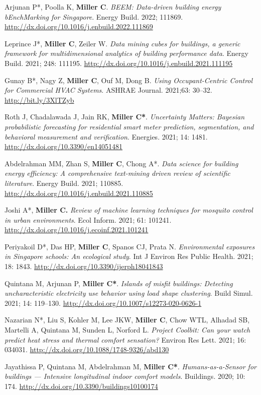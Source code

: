 \documentclass[10pt,a4paper]{article}
\begin{document}
\begin{small}
\begin{etaremune}
\item
Arjunan P*, Poolla K, \textbf{Miller C}. \emph{BEEM: Data-driven building energy bEnchMarking for Singapore}. Energy Build. 2022; 111869. \url{http://dx.doi.org/10.1016/j.enbuild.2022.111869}
\item
Leprince J*, \textbf{Miller C}, Zeiler W. \emph{Data mining cubes for buildings, a generic framework for multidimensional analytics of building performance data}. Energy Build. 2021; 248: 111195. \url{http://dx.doi.org/10.1016/j.enbuild.2021.111195}
\item
Gunay B*, Nagy Z, \textbf{Miller C}, Ouf M, Dong B. \emph{Using Occupant-Centric Control for Commercial HVAC Systems}. ASHRAE Journal. 2021;63: 30–32. \url{http://bit.ly/3XlTZyb}
\item
Roth J, Chadalawada J, Jain RK, \textbf{Miller C*}. \emph{Uncertainty Matters: Bayesian probabilistic forecasting for residential smart meter prediction, segmentation, and behavioral measurement and verification}. Energies. 2021; 14: 1481. \url{http://dx.doi.org/10.3390/en14051481}
\item
Abdelrahman MM, Zhan S, \textbf{Miller C}, Chong A*. \emph{Data science for building energy efficiency: A comprehensive text-mining driven review of scientific literature}. Energy Build. 2021; 110885. \url{http://dx.doi.org/10.1016/j.enbuild.2021.110885}
\item
Joshi A*, \textbf{Miller C.} \emph{Review of machine learning techniques for mosquito control in urban environments}. Ecol Inform. 2021; 61: 101241. \url{http://dx.doi.org/10.1016/j.ecoinf.2021.101241}
\item
Periyakoil D*, Das HP, \textbf{Miller C}, Spanos CJ, Prata N. \emph{Environmental exposures in Singapore schools: An ecological study}. Int J Environ Res Public Health. 2021; 18: 1843. \url{http://dx.doi.org/10.3390/ijerph18041843}
\item
Quintana M, Arjunan P, \textbf{Miller C*}. \emph{Islands of misfit buildings: Detecting uncharacteristic electricity use behavior using load shape clustering}. Build Simul. 2021; 14: 119–130. \url{http://dx.doi.org/10.1007/s12273-020-0626-1}
\item
Nazarian N*, Liu S, Kohler M, Lee JKW, \textbf{Miller C}, Chow WTL, Alhadad SB, Martelli A, Quintana M, Sunden L, Norford L. \emph{Project Coolbit: Can your watch predict heat stress and thermal comfort sensation?} Environ Res Lett. 2021; 16: 034031. \url{http://dx.doi.org/10.1088/1748-9326/abd130}
\item
Jayathissa P, Quintana M, Abdelrahman M, \textbf{Miller C*}. \emph{Humans-as-a-Sensor for buildings — Intensive longitudinal indoor comfort models}. Buildings. 2020; 10: 174. \url{http://dx.doi.org/10.3390/buildings10100174}%

\end{etaremune}
\end{small}
\end{document}
